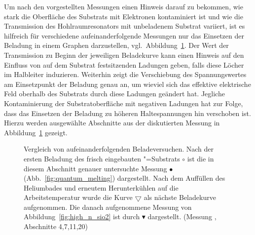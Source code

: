 Um nach den vorgestellten Messungen einen Hinweis darauf zu bekommen, wie stark die Oberfläche des Substrats mit Elektronen kontaminiert ist und wie die Transmission des Hohlraumresonators mit unbeladenem Substrat variiert, ist es hilfreich für verschiedene aufeinanderfolgende Messungen nur das Einsetzen der Beladung in einem Graphen darzustellen, vgl.\ Abbildung~\ref{fig:quantum_reproduce}.
Der Wert der Transmission zu Beginn der jeweiligen Beladekurve kann einen Hinweis auf den Einfluss von auf dem Substrat festsitzenden Ladungen geben, falls diese Löcher im Halbleiter induzieren. Weiterhin zeigt die Verschiebung des Spannungswertes am Einsetzpunkt der Beladung genau an, um wieviel sich das effektive elektrische Feld oberhalb des Substrats durch diese Ladungen geändert hat. Jegliche Kontaminierung der Substratoberfläche mit negativen Ladungen hat zur Folge, dass das Einsetzen der Beladung zu höheren Haltespannungen hin verschoben ist. Hierzu werden ausgewählte Abschnitte aus der diskutierten Messung  in Abbildung~\ref{fig:quantum_reproduce} gezeigt.

\begin{figure}[h!tb]
    \hfill%
    \begin{minipage}[b]{\textwidth-\smidwidth-\tabcolsep}
        \caption[Hohe Elektronendichten auf \SiO, Vergleich aufeinanderfolgender Beladeversuche]{Vergleich von aufeinanderfolgenden Beladeversuchen. Nach der ersten Beladung des frisch eingebauten \SiO"=Substrats {\large$\circ$} ist die in diesem Abschnitt genauer untersuchte Messung {\large$\bullet$} (Abb.~\ref{fig:quantum_melting}) dargestellt. Nach dem Auffüllen des Heliumbades und erneutem Herunterkühlen auf die Arbeitstemperatur wurde die Kurve $\bigtriangledown$ als nächste Beladekurve aufgenommen. Die danach aufgenommene Messung von Abbildung~\ref{fig:high_n_sio2} ist durch $\blacktriangledown$ dargestellt. (Messung , Abschnitte 4,7,11,20)}
        \label{fig:quantum_reproduce}
    \end{minipage}
\end{figure}

